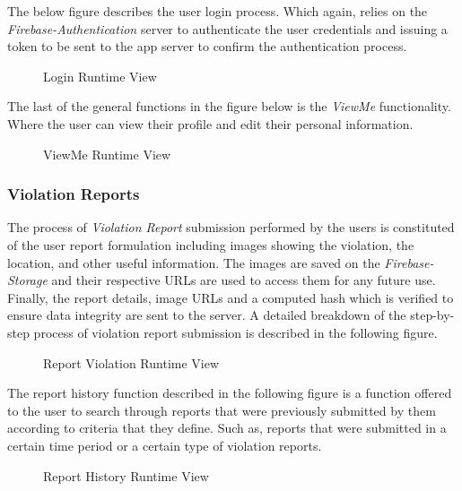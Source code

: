 \begin{minipage}{\textwidth}
The below figure describes the user login process. Which again, relies on the \emph{Firebase-Authentication} server to authenticate the user credentials and issuing a token to be sent to the app server to confirm the authentication process.
\begin{figure}[H]
\caption{Login Runtime View}
\label{fig:RuntimeLog}
\centering

\end{figure}
\end{minipage}

\begin{minipage}{\textwidth}
The last of the general functions in the figure below is the \emph{ViewMe} functionality. Where the user can view their profile and edit their personal information.
\begin{figure}[H]
\caption{ViewMe Runtime View}
\label{fig:RuntimeProf}
\centering

\end{figure}
\end{minipage}

\subsubsection{Violation Reports}
The process of \emph{Violation Report} submission performed by the users is constituted of the user report formulation including images showing the violation, the location, and other useful information. The images are saved on the \emph{Firebase-Storage} and their respective URLs are used to access them for any future use. Finally, the report details, image URLs and a computed hash which is verified to ensure data integrity are sent to the server. A detailed breakdown of the step-by-step process of violation report submission is described in the following figure.

\begin{figure}[H]
\caption{Report Violation Runtime View}
\label{fig:RuntimeRep}
\centering

\end{figure}

\begin{minipage}{\textwidth}
The report history function described in the following figure is a function offered to the user to search through reports that were previously submitted by them according to criteria that they define. Such as, reports that were submitted in a certain time period or a certain type of violation reports.
\begin{sidewaysfigure}
\begin{figure}[H]
\caption{Report History Runtime View}
\label{fig:RuntimeHist}
\centering

\end{figure}
\end{sidewaysfigure}
\end{minipage}


